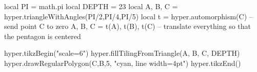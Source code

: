 \documentclass[tikz]{standalone}
\begin{document}
\begin{luacode*}
local PI = math.pi
local DEPTH = 23
local A, B, C = hyper.triangleWithAngles(PI/2,PI/4,PI/5)
local t = hyper.automorphism(C) -- send point C to zero
A, B, C = t(A), t(B), t(C) -- translate everything so that the pentagon is centered

hyper.tikzBegin("scale=6")
hyper.fillTilingFromTriangle(A, B, C, DEPTH)
hyper.drawRegularPolygon(C,B,5, "cyan, line width=4pt")
hyper.tikzEnd()
\end{luacode*}
\end{document}

